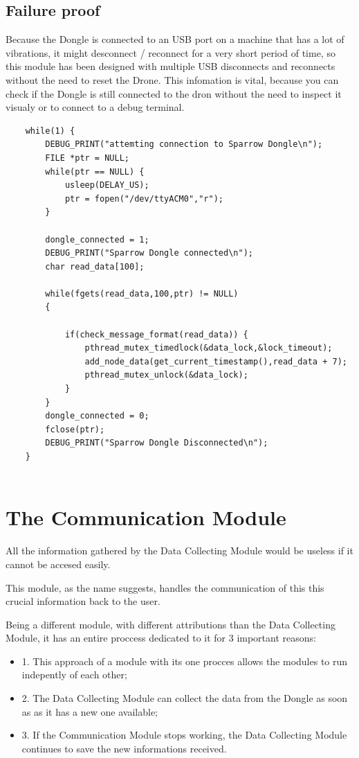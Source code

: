\subsection{Failure proof}

Because the Dongle is connected to an USB port on a machine that has a lot of vibrations, it might desconnect / reconnect for a very short period of time, so this module has been designed  with multiple USB disconnects and reconnects without the need to reset the Drone. This infomation is vital, because you can check if the Dongle is still connected to the dron without the need to inspect it visualy or to connect to a debug terminal.

\lstset{numbers=none, mathescape=true, nolol=false,caption=Data Collection use of mutex,label=lst:task}
\begin{lstlisting}
	while(1) {
		DEBUG_PRINT("attemting connection to Sparrow Dongle\n");
		FILE *ptr = NULL;	
		while(ptr == NULL) {	
			usleep(DELAY_US);
			ptr = fopen("/dev/ttyACM0","r"); 
		}

		dongle_connected = 1;
		DEBUG_PRINT("Sparrow Dongle connected\n");
		char read_data[100]; 
	 
		while(fgets(read_data,100,ptr) != NULL) 
		{
			
			if(check_message_format(read_data)) {
	   	 		pthread_mutex_timedlock(&data_lock,&lock_timeout); 
				add_node_data(get_current_timestamp(),read_data + 7);
				pthread_mutex_unlock(&data_lock);
			}
		}
		dongle_connected = 0;
		fclose(ptr);
		DEBUG_PRINT("Sparrow Dongle Disconnected\n");	
	}
 
\end{lstlisting}

\clearpage

\section{The Communication Module}

All the information gathered by the Data Collecting Module would be useless if it cannot be accesed easily. 

This module, as the name suggests, handles the communication of this this crucial information back to the user.

Being a different module, with different attributions than the Data Collecting Module, it has an entire proccess dedicated to it for 3 important reasons:
\begin{itemize}

\item 1. This approach of a module with its one procces allows the modules to run indepently of each other;
\item 2. The Data Collecting Module can collect the data from the Dongle as soon as as it has a new one available;
\item 3. If the Communication Module stops working, the Data Collecting Module continues to save the new informations received. 

\end{itemize}

